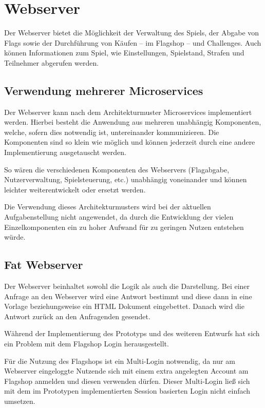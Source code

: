 \section{Webserver} \label{sec:Webserver}
Der Webserver bietet die Möglichkeit der Verwaltung des Spiels, der Abgabe von Flags sowie der Durchführung von Käufen -- im Flagshop -- und Challenges. Auch können Informationen zum Spiel, wie Einstellungen, Spielstand, Strafen und Teilnehmer abgerufen werden.

\subsection{Verwendung mehrerer Microservices}
Der Webserver kann nach dem Architekturmuster Microservices implementiert werden. Hierbei besteht die Anwendung aus mehreren unabhängig Komponenten, welche, sofern dies notwendig ist, untereinander kommunizieren. Die Komponenten sind so klein wie möglich und können jederzeit durch eine andere Implementierung ausgetauscht werden. \cite{wolffMicroservicesGrundlagenFlexibler2015} 

So wären die verschiedenen Komponenten des Webservers (Flagabgabe, Nutzerverwaltung, Spielsteuerung, etc.) unabhängig voneinander und können leichter weiterentwickelt oder ersetzt werden.

Die Verwendung dieses Architekturmusters wird bei der aktuellen Aufgabenstellung nicht angewendet, da durch die Entwicklung der vielen Einzelkomponenten ein zu hoher Aufwand für zu geringen Nutzen entstehen würde.

\subsection{Fat Webserver}
Der Webserver beinhaltet sowohl die Logik als auch die Darstellung. Bei einer Anfrage an den Webserver wird eine Antwort bestimmt und diese dann in eine Vorlage beziehungsweise ein HTML Dokument eingebettet. Danach wird die Antwort zurück an den Anfragenden gesendet.

Während der Implementierung des Prototyps und des weiteren Entwurfs hat sich ein Problem mit dem Flagshop Login herausgestellt.

Für die Nutzung des Flagshops ist ein Multi-Login notwendig, da nur am Webserver eingeloggte Nutzende sich mit einem extra angelegten Account am Flagshop anmelden und diesen verwenden dürfen. Dieser Multi-Login ließ sich mit dem im Prototypen implementierten Session basierten Login nicht einfach umsetzen. 

